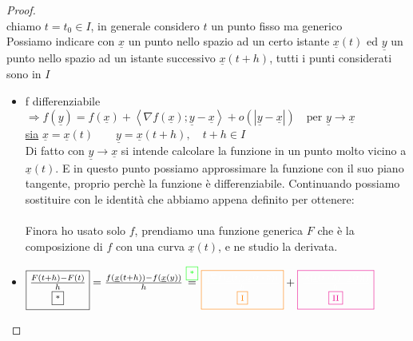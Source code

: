 \documentclass[a4paper, oneside]{article}
\begin{document}
        \begin{proof}
            \hfil\\
            chiamo $t = t_0 \in I$, in generale considero $t$ un punto fisso ma generico\\
            Possiamo indicare con $\underline{x}$ un punto nello spazio ad un certo istante $\underline{x}(t)$ ed $\underline{y}$ un punto nello spazio ad un istante successivo $\underline{x}(t+h)$, tutti i punti considerati sono in $I$\\
            \begin{itemize}
                \item f differenziabile $\Rightarrow f(\underline{y}) = f(\underline{x}) + \left\langle \nabla f (\underline{x}); \underline{y}- \underline{x} \right\rangle + o(\left\lvert \underline{y} - \underline{x} \right\rvert) \quad \text{per } \underline{y} \to \underline{x}$\\
                \underline{sia} $\underline{x} = \underline{x}(t) \qquad \underline{y} = \underline{x}(t+h), \quad t+h \in I$\\
                Di fatto con $\underline{y} \to \underline{x}$ si intende calcolare la funzione in un punto molto vicino a $\underline{x}(t)$. E in questo punto possiamo approssimare la funzione con il suo piano tangente, proprio perchè la funzione è differenziabile. Continuando possiamo sostituire
                con le identità che abbiamo appena definito per ottenere:\\
                \textcolor{green}{}  \textcolor{green}{\fbox{*}}\\
                Finora ho usato solo $f$, prendiamo una funzione generica $F$ che è la composizione di $f$ con una curva $\underline{x}(t)$, e ne studio la derivata.\\
                \item $\text{\fbox{$\underset{\text{\fbox{*}}}{\frac{F(t+h)-F(t)}{h}}$}} = \frac{f(\underline{x}(t+h))-f(\underline{x}(y))}{h} \overset{\text{\textcolor{green}{\fbox{*}}}}{=} \textcolor{orange}{\text{\fbox{\textcolor{white}{$\underset{\textcolor{orange}{\text{\fbox{I}}}}{\frac{\left\langle \nabla f(\underline{x}(t));\underline{x}(t+h)\right\rangle }{h}}$}}}} + \textcolor{magenta}{\text{\fbox{$\textcolor{white}{\underset{\text{\textcolor{magenta}{\fbox{II}}}}{\frac{o(\left\lvert \underline{x}(t+h) -\underline{x}(t)\right\rvert )}{h}}}$}}}$ \\

\end{itemize}
\end{proof}
\end{document}
